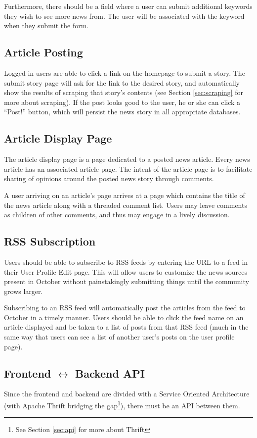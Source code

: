 \documentclass[11pt,letterpaper]{article}
\begin{document}
Furthermore, there should be a field where a user can submit additional keywords they wish to see more news from.
The user will be associated with the keyword when they submit the form.

\subsection{Article Posting}
Logged in users are able to click a link on the homepage to submit a story.
The submit story page will ask for the link to the desired story, and automatically show the results of scraping that story's contents (see Section \ref{sec:scraping} for more about scraping).
If the post looks good to the user, he or she can click a ``Post!'' button, which will persist the news story in all appropriate databases.

\subsection{Article Display Page}
The article display page is a page dedicated to a posted news article. Every news article has an associated article page.
The intent of the article page is to facilitate sharing of opinions around the posted news story through comments.

A user arriving on an article's page arrives at a page which contains the title of the news article along with a threaded comment list.
Users may leave comments as children of other comments, and thus may engage in a lively discussion.

\subsection{RSS Subscription}
\label{sec:rssrequirements}
Users should be able to subscribe to RSS feeds by entering the URL to a feed in their User Profile Edit page.
This will allow users to customize the news sources present in October without painstakingly submitting things until the community grows larger.

Subscribing to an RSS feed will automatically post the articles from the feed to October in a timely manner.
Users should be able to click the feed name on an article displayed and be taken to a list of posts from that RSS feed (much in the same way that users can see a list of another user's posts on the user profile page).

\subsection{Frontend $\leftrightarrow$ Backend API}
Since the frontend and backend are divided with a Service Oriented Architecture (with Apache Thrift bridging the gap\footnote{See Section \ref{sec:api} for more about Thrift}), there must be an API between them.
\end{document}
